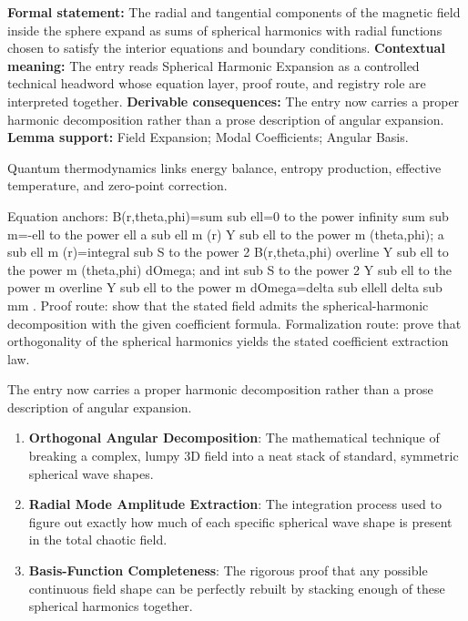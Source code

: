 \begingroup\footnotesize\setlength{\emergencystretch}{3em}\sloppy
\textbf{Formal statement:} The radial and tangential components of the magnetic field inside the sphere expand as sums of spherical harmonics with radial functions chosen to satisfy the interior equations and boundary conditions. \textbf{Contextual meaning:} The entry reads Spherical Harmonic Expansion as a controlled technical headword whose equation layer, proof route, and registry role are interpreted together. \textbf{Derivable consequences:} The entry now carries a proper harmonic decomposition rather than a prose description of angular expansion. \textbf{Lemma support:} Field Expansion; Modal Coefficients; Angular Basis.\par
\endgroup

Quantum thermodynamics links energy balance, entropy production, effective temperature, and zero-point correction.

Equation anchors: B(r,theta,phi)=sum sub ell=0 to the power infinity sum sub m=-ell to the power ell a sub ell m (r) Y sub ell to the power m (theta,phi); a sub ell m (r)=integral sub S to the power 2 B(r,theta,phi) overline Y sub ell to the power m (theta,phi) dOmega; and int sub S to the power 2 Y sub ell to the power m overline Y sub ell to the power m dOmega=delta sub ellell delta sub mm . Proof route: show that the stated field admits the spherical-harmonic decomposition with the given coefficient formula. Formalization route: prove that orthogonality of the spherical harmonics yields the stated coefficient extraction law.

The entry now carries a proper harmonic decomposition rather than a prose description of angular expansion.
\endgroup

\begin{enumerate}[leftmargin=1.6em,itemsep=6pt,topsep=4pt]
\item \textbf{Orthogonal Angular Decomposition}: The mathematical technique of breaking a complex, lumpy 3D field into a neat stack of standard, symmetric spherical wave shapes.
\item \textbf{Radial Mode Amplitude Extraction}: The integration process used to figure out exactly how much of each specific spherical wave shape is present in the total chaotic field.
\item \textbf{Basis-Function Completeness}: The rigorous proof that any possible continuous field shape can be perfectly rebuilt by stacking enough of these spherical harmonics together.
\end{enumerate}

